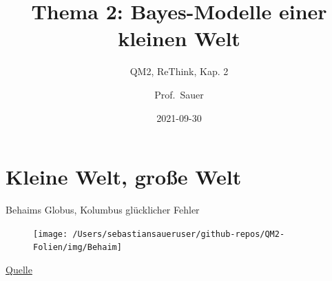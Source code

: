 \documentclass[
  ngerman,
  ignorenonframetext,
]{beamer}
\title{Thema 2: Bayes-Modelle einer kleinen Welt}
\subtitle{QM2, ReThink, Kap. 2}
\author{Prof.~Sauer}
\date{2021-09-30}
\institute{AWM, HS Ansbach}
\begin{document}
\frame{\titlepage}

\begin{frame}[allowframebreaks]
  \tableofcontents[hideallsubsections]
\end{frame}
\hypertarget{kleine-welt-grouxdfe-welt}{%
\section{Kleine Welt, große Welt}\label{kleine-welt-grouxdfe-welt}}

\begin{frame}{Behaims Globus, Kolumbus glücklicher Fehler}
\protect\hypertarget{behaims-globus-kolumbus-gluxfccklicher-fehler}{}
\begin{figure}[H]
\texttt{[image: /Users/sebastiansaueruser/github-repos/QM2-Folien/img/Behaim]} \end{figure}

\href{https://de.wikipedia.org/wiki/Martin_Behaims_Erdapfel\#/media/Datei:RavensteinBehaim.jpg}{Quelle}
\end{frame}
\end{document}
